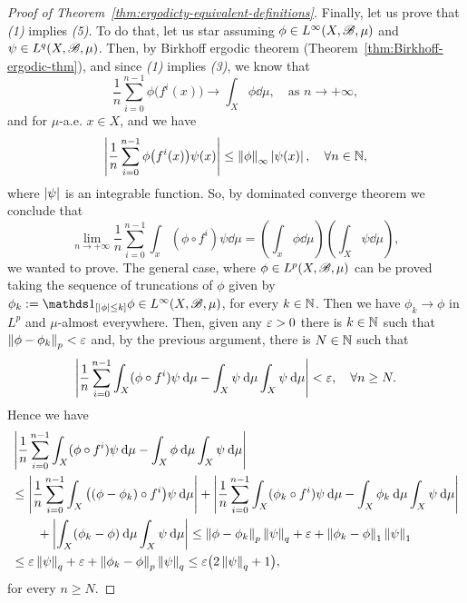 \begin{proof}[Proof of Theorem~\ref{thm:ergodicty-equivalent-definitions}]
  Finally, let us prove that \emph{(1)} implies \emph{(5)}. To do that, let us star assuming $\phi\in L^{\infty}(X,\mathscr{B},\mu)$ and $\psi\in L^{q}(X,\mathscr{B},\mu)$. Then, by Birkhoff ergodic theorem (Theorem~\ref{thm:Birkhoff-ergodic-thm}), and since \emph{(1)} implies \emph{(3)}, we know that
  \begin{displaymath}
    \frac{1}{n}\sum_{i=0}^{n-1}\phi\big(f^{i}(x)\big)\to\int_{X}\phi\dd\mu, \quad\text{as }n\to+\infty,
  \end{displaymath}
  and for $\mu$-a.e. $x\in X$, and we have
  \begin{displaymath}
    \left\lvert{\frac{1}{n}\sum_{i=0}^{n-1}\phi\big(f^{i}(x)\big)\psi(x)}\right\rvert \leq \left\|{\phi}\right\|_{\infty}\left\lvert{\psi(x)}\right\rvert, \quad\forall n\in\mathbb{N},
  \end{displaymath}
  where $\left\lvert{\psi}\right\rvert$ is an integrable function. So, by dominated converge theorem we conclude that
  \begin{displaymath}
    \lim_{n\to+\infty}\frac{1}{n}\sum_{i=0}^{n-1}\int_{x}(\phi\circ f^{i})\psi\dd\mu = \left(\int_{x}\phi\dd\mu\right)\left(\int_{X}\psi\dd\mu\right),
  \end{displaymath}
  we wanted to prove. The general case, where $\phi\in L^{p}(X,\mathscr{B},\mu)$ can be proved taking the sequence of truncations of $\phi$ given by $\phi_{k}:=\ds{1}_{[\abs{\phi}\leq k]}\phi\in L^{\infty}(X,\B,\mu)$, for every $k\in\mathbb{N}$. Then we have $\phi_{k}\to\phi$ in $L^{p}$ and $\mu$-almost everywhere. Then, given any $\varepsilon>0$ there is $k\in\mathbb{N}$ such that $\left\|{\phi-\phi_{k}}\right\|_{p}<\varepsilon$ and, by the previous argument, there is $N\in\mathbb{N}$ such that
  \begin{displaymath}
    \left\lvert{\frac{1}{n}\sum_{i=0}^{n-1}\int_{X}(\phi\circ f^{i})\psi\:\mathrm{d}\mu - \int_{X}\psi\:\mathrm{d}\mu\int_{X}\psi\:\mathrm{d}\mu}\right\rvert < \varepsilon, \quad\forall n\geq N.
  \end{displaymath}
  Hence we have
  \begin{displaymath}
    \begin{split}
      &\left\lvert{\frac{1}{n}\sum_{i=0}^{n-1}\int_{X}(\phi\circ f^{i})\psi\:\mathrm{d}\mu - \int_{X}\phi\:\mathrm{d}\mu\int_{X}\psi\:\mathrm{d}\mu}\right\rvert \\
      & \leq \left\lvert{\frac{1}{n}\sum_{i=0}^{n-1}\int_{X}\big((\phi-\phi_{k})\circ f^{i}\big)\psi\:\mathrm{d}\mu}\right\rvert + \left\lvert{\frac{1}{n}\sum_{i=0}^{n-1}\int_{X}(\phi_{k}\circ f^{i})\psi\:\mathrm{d}\mu - \int_{X}\phi_{k}\:\mathrm{d}\mu\int_{X}\psi\:\mathrm{d}\mu}\right\rvert \\
      &\qquad + \left\lvert{\int_{X}(\phi_{k}-\phi)\:\mathrm{d}\mu\int_{X}\psi\:\mathrm{d}\mu}\right\rvert \leq \left\|{\phi-\phi_{k}}\right\|_{p}\left\|{\psi}\right\|_{q} + \varepsilon + \left\|{\phi_{k}-\phi}\right\|_{1}\left\|{\psi}\right\|_{1} \\
      &\leq \varepsilon\left\|{\psi}\right\|_{q} +\varepsilon + \left\|{\phi_{k}-\phi}\right\|_{p}\left\|{\psi}\right\|_{q} \leq \varepsilon \big(2\left\|{\psi}\right\|_{q} + 1\big),
    \end{split}
  \end{displaymath}
  for every $n\geq N$.
\end{proof}

